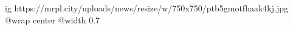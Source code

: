  
 
 
 
 

\ifcmt
  ig https://mrpl.city/uploads/news/resize/w/750x750/ptb5gmotfhaak4kj.jpg
  @wrap center
  @width 0.7
\fi
